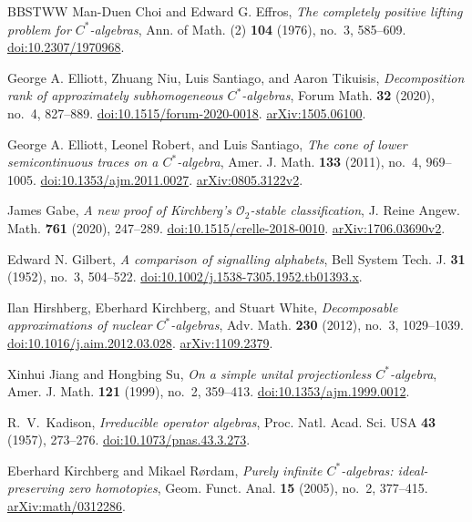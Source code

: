 \begin{thebibliography}{BBSTWW}
Man-Duen Choi and Edward G. Effros,
\emph{The completely positive lifting problem for $C^*$-algebras},
Ann. of Math. (2) \textbf{104} (1976), no.~3, 585--609.
\href{https://doi.org/10.2307/1970968}{doi:10.2307/1970968}.

George A. Elliott, Zhuang Niu, Luis Santiago, and Aaron Tikuisis,
\emph{Decomposition rank of approximately subhomogeneous $C^*$-algebras},
Forum Math. \textbf{32} (2020), no.~4, 827--889.
\href{https://doi.org/10.1515/forum-2020-0018}{doi:10.1515/forum-2020-0018}.
\href{https://arxiv.org/abs/1505.06100}{arXiv:1505.06100}.

George A. Elliott, Leonel Robert, and Luis Santiago,
\emph{The cone of lower semicontinuous traces on a $C^*$-algebra},
Amer. J. Math. \textbf{133} (2011), no.~4, 969--1005.
\href{https://doi.org/10.1353/ajm.2011.0027}{doi:10.1353/ajm.2011.0027}.
\href{https://arxiv.org/abs/0805.3122v2}{arXiv:0805.3122v2}.

James Gabe,
\emph{A new proof of Kirchberg's $\mathcal O_2$-stable classification},
J. Reine Angew. Math. \textbf{761} (2020), 247--289.
\href{https://doi.org/10.1515/crelle-2018-0010}{doi:10.1515/crelle-2018-0010}.
\href{https://arxiv.org/abs/1706.03690v2}{arXiv:1706.03690v2}.

Edward N. Gilbert,
\emph{A comparison of signalling alphabets},
Bell System Tech. J. \textbf{31} (1952), no.~3, 504--522.
\href{https://doi.org/10.1002/j.1538-7305.1952.tb01393.x}{doi:10.1002/j.1538-7305.1952.tb01393.x}.

Ilan Hirshberg, Eberhard Kirchberg, and Stuart White,
\emph{Decomposable approximations of nuclear $C^*$-algebras},
Adv. Math. \textbf{230} (2012), no.~3, 1029--1039.
\href{https://doi.org/10.1016/j.aim.2012.03.028}{doi:10.1016/j.aim.2012.03.028}.
\href{https://arxiv.org/abs/1109.2379}{arXiv:1109.2379}.

Xinhui Jiang and Hongbing Su,
\emph{On a simple unital projectionless $C^*$-algebra},
Amer. J. Math. \textbf{121} (1999), no.~2, 359--413.
\href{https://doi.org/10.1353/ajm.1999.0012}{doi:10.1353/ajm.1999.0012}.

 R.~V.~Kadison,
\emph{Irreducible operator algebras},
Proc. Natl. Acad. Sci. USA \textbf{43} (1957), 273--276.
\href{https://doi.org/10.1073/pnas.43.3.273}{doi:10.1073/pnas.43.3.273}.

Eberhard Kirchberg and Mikael R\o rdam,
\emph{Purely infinite $C^*$-algebras: ideal-preserving zero homotopies},
Geom. Funct. Anal. \textbf{15} (2005), no.~2, 377--415.
\href{https://arxiv.org/abs/math/0312286}{arXiv:math/0312286}.


\end{thebibliography}
